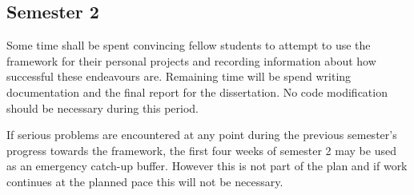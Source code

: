 \subsection{Semester 2}
Some time shall be spent convincing fellow students to attempt to use the framework for their personal projects and recording information about how successful these endeavours are.
Remaining time will be spend writing documentation and the final report for the dissertation. No code modification should be necessary during this period.

If serious problems are encountered at any point during the previous semester's progress towards the framework, the first four weeks of semester 2 may be used as an emergency catch-up buffer. However this is not part of the plan and if work continues at the planned pace this will not be necessary.
